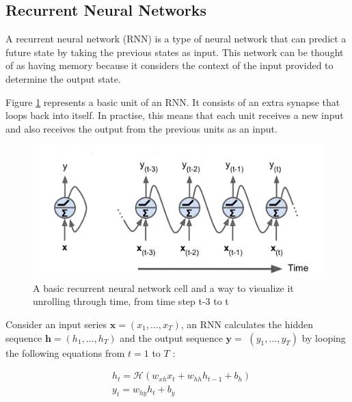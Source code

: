 \subsection {Recurrent Neural Networks}
A recurrent neural network (RNN) is a type of neural network that can predict a future state by taking the previous states as input. \cite{Graves2013SpeechNetworks} This network can be thought of as having memory because it considers the context of the input provided to determine the output state. \cite{HagnerRecurrentModel}

Figure \ref{fig:rnn} represents a basic unit of an RNN. It consists of an extra synapse that loops back into itself. In practise, this means that each unit receives a new input and also receives the output from the previous units as an input.
\begin{figure}[ht]
  \begin{center}
    \includegraphics[width=\textwidth]{images/rnn.png} 
    \caption{A basic recurrent neural network cell and a way to visualize it
unrolling through time, from time step t-3 to t \cite{HagnerRecurrentModel}}
    \label{fig:rnn}
  \end{center}
\end{figure}

Consider an input series $\boldsymbol{x}=\left(x_{1}, \ldots, x_{T}\right)$, an RNN calculates the hidden sequence $\boldsymbol{h}=\left(h_{1}, \ldots, h_{T}\right)$ and the output sequence $\boldsymbol{y}=$ $\left(y_{1}, \ldots, y_{T}\right)$ by looping the following equations from $t=1$ to $T$ :

$$
\begin{aligned}
&h_{t}=\mathcal{H}\left(w_{xh} x_{t}+w_{hh} h_{t-1}+b_{h}\right) \\
&y_{t}=w_{h y} h_{t}+b_{y}
\end{aligned}
$$

